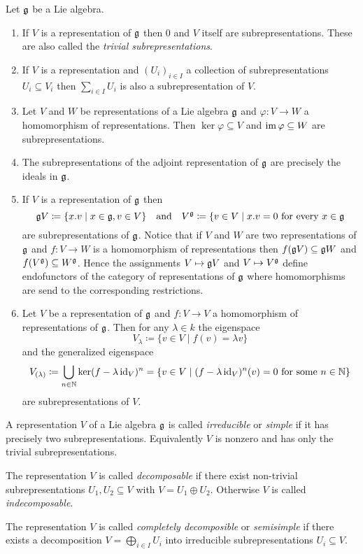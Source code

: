 \begin{expls}
 Let $\mathfrak{g}$ be a Lie algebra.
 \begin{enumerate}[leftmargin=*]
  \item
   If $V$ is a representation of $\mathfrak{g}$ then $0$ and $V$ itself are subrepresentations. These are also called the \emph{trivial subrepresentations}.
  \item
   If $V$ is a representation and $(U_i)_{i \in I}$ a collection of subrepresentations $U_i \subseteq V_i$ then $\sum_{i \in I} U_i$ is also a subrepresentation of $V$.
  \item
   Let $V$ and $W$ be representations of a Lie algebra $\mathfrak{g}$ and $\varphi \colon V \to W$ a homomorphism of representations. Then $\ker \varphi \subseteq V$ and $\operatorname{im} \varphi \subseteq W$ are subrepresentations.
  \item
   The subrepresentations of the adjoint representation of $\mathfrak{g}$ are precisely the ideals in $\mathfrak{g}$.
  \item
   If $V$ is a representation of $\mathfrak{g}$ then
   \[
    \mathfrak{g} V \coloneqq \{x.v \mid x \in \mathfrak{g}, v \in V\}
    \quad\text{and}\quad
    V^{\mathfrak{g}} \coloneqq \{v \in V \mid \text{$x.v = 0$ for every $x \in \mathfrak{g}$}
   \]
   are subrepresentations of $\mathfrak{g}$. Notice that if $V$ and $W$ are two representations of $\mathfrak{g}$ and $f \colon V \to W$ is a homomorphism of representations then $f(\mathfrak{g} V) \subseteq \mathfrak{g} W$ and $f(V^{\mathfrak{g}}) \subseteq W^{\mathfrak{g}}$. Hence the assignments $V \mapsto \mathfrak{g} V$ and $V \mapsto V^{\mathfrak{g}}$ define endofunctors of the category of representations of $\mathfrak{g}$ where homomorphisms are send to the corresponding restrictions.
  \item
   Let $V$ be a representation of $\mathfrak{g}$ and $f \colon V \to V$ a homomorphism of representations of $\mathfrak{g}$. Then for any $\lambda \in k$ the eigenspace
   \[
    V_\lambda \coloneqq \{v \in V \mid f(v) = \lambda v\}
   \]
   and the generalized eigenspace
   \[
    V_{(\lambda)}
    \coloneqq \bigcup_{n \in \mathbb{N}} \ker(f - \lambda \operatorname{id}_V)^n
    = \{v \in V \mid \text{$(f - \lambda \operatorname{id}_V)^n(v) = 0$ for some $n \in \mathbb{N}$}\}
   \]
   are subrepresentations of $V$.
 \end{enumerate}
\end{expls}


\begin{defi}
 A representation $V$ of a Lie algebra $\mathfrak{g}$ is called \emph{irreducible} or \emph{simple} if it has precisely two subrepresentations. Equivalently $V$ is nonzero and has only the trivial subrepresentations.
 
 The representation $V$ is called \emph{decomposable} if there exist non-trivial subrepresentations $U_1, U_2 \subseteq V$ with $V = U_1 \oplus U_2$. Otherwise $V$ is called \emph{indecomposable}.
 
 The representation $V$ is called \emph{completely decomposible} or \emph{semisimple} if there exists a decomposition $V = \bigoplus_{i \in I} U_i$ into irreducible subrepresentations $U_i \subseteq V$.
\end{defi}


